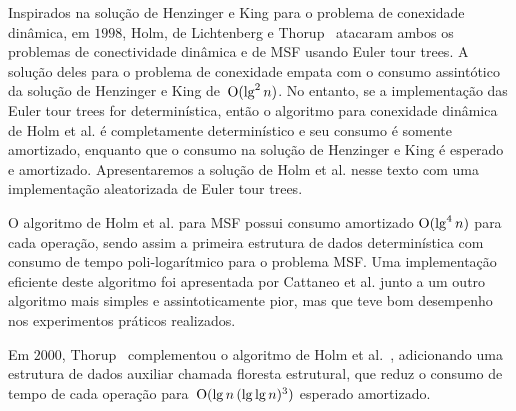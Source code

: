 

Inspirados na solução de Henzinger e King para o problema de conexidade dinâmica, em $1998$, Holm, de Lichtenberg e Thorup~\cite{poly_log} atacaram ambos os problemas de conectividade dinâmica e de MSF usando Euler tour trees.
A solução deles para o problema de conexidade empata com o consumo assintótico da solução de Henzinger e King de~$\mathrm{O}(\lg^2 n)$.
No entanto, se a implementação das Euler tour trees for determinística, então o algoritmo para conexidade dinâmica de Holm et al. é completamente determinístico e seu consumo é somente amortizado,
enquanto que o consumo na solução de Henzinger e King é esperado e amortizado. 
Apresentaremos a solução de Holm et al. nesse texto com uma implementação aleatorizada de Euler tour trees.

O algoritmo de Holm et al. para MSF possui consumo amortizado $\mathrm{O}(\lg^4 n)$ para cada operação, sendo assim a primeira estrutura de dados determinística com consumo de tempo poli-logarítmico para o problema MSF. Uma implementação eficiente deste algoritmo foi apresentada por Cattaneo et al. \cite{xpstudy2002} junto a um outro algoritmo mais simples e assintoticamente pior, mas que teve bom desempenho nos experimentos práticos realizados.

Em $2000$, Thorup~\cite{Thorup2000} complementou o algoritmo de Holm et al.~\cite{poly_log}, adicionando uma estrutura de dados auxiliar chamada floresta estrutural, que reduz o consumo de tempo de cada operação para~$\mathrm{O}(\lg n\, (\lg\lg n)^3)$ esperado amortizado.

